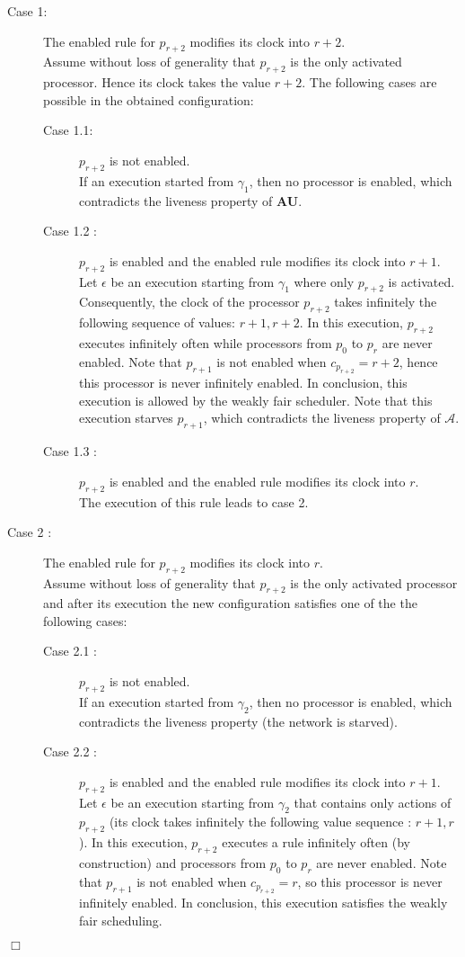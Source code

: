 \documentclass[11pt,english,letterpaper]{article}
\newenvironment{proof}{{\noindent\bf Proof. } }{{\hfill $\Box$}}
\begin{document}
\begin{proof}
\begin{description}
\item[Case 1:] The enabled rule for $p_{r+2}$ modifies its clock into $r+2$. \\
Assume without loss of generality that $p_{r+2}$ is the only activated processor. Hence its clock takes the value $r+2$. The following cases are possible in the obtained configuration:

\begin{description}
\item[Case 1.1:] $p_{r+2}$ is not enabled.\\
If an execution started from $\gamma_{1}$, then no processor is enabled, which contradicts the liveness property of \textbf{AU}.
\item[Case 1.2 :] $p_{r+2}$ is enabled and the enabled rule modifies its clock into $r+1$.\\
Let $\epsilon$ be an execution starting from $\gamma_{1}$ where only $p_{r+2}$ is activated. Consequently, the clock of the processor $p_{r+2}$ takes infinitely the following sequence of values: $r+1,r+2$. In this execution, $p_{r+2}$ executes infinitely often while processors from $p_{0}$ to $p_{r}$ are never enabled. Note that $p_{r+1}$ is not enabled when $c_{p_{r+2}}=r+2$, hence this processor is never infinitely enabled. In conclusion, this execution is allowed by the weakly fair scheduler. Note that this execution starves $p_{r+1}$, which contradicts the liveness property of $\mathcal{A}$. 
\item[Case 1.3 :] $p_{r+2}$ is enabled and the enabled rule modifies its clock into $r$.\\
The execution of this rule leads to case 2.
\end{description}

\item[Case 2 :] The enabled rule for $p_{r+2}$ modifies its clock into $r$. \\
Assume without loss of generality that $p_{r+2}$ is the only activated processor and after its execution the new configuration satisfies one of the the following cases:

\begin{description}
\item[Case 2.1 :] $p_{r+2}$ is not enabled.\\
If an execution started from $\gamma_{2}$, then no processor is enabled, which contradicts the liveness property (the network is starved).
\item[Case 2.2 :] $p_{r+2}$ is enabled and the enabled rule modifies its clock into $r+1$.\\
Let $\epsilon$ be an execution starting from $\gamma_{2}$ that contains only actions of $p_{r+2}$ (its clock takes infinitely the following value sequence : $r+1,r$). In this execution, $p_{r+2}$ executes a rule infinitely often (by construction) and processors from $p_{0}$ to $p_{r}$ are never enabled. Note that $p_{r+1}$ is not enabled when $c_{p_{r+2}}=r$, so this processor is never infinitely enabled. In conclusion, this execution satisfies the weakly fair scheduling. 


\end{description}
\end{description}
\end{proof}
\end{document}
